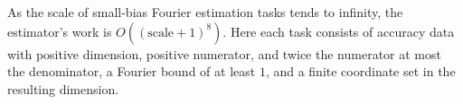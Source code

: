 \begin{theorem}
\label{FABL.deterministicSmallBiasFourierEstimator_work_isBigO}
\leanok
{}
As the scale of small-bias Fourier estimation tasks tends to infinity, the estimator's
work is $O((\text{scale}+1)^8)$. Here each task consists of accuracy data with positive
dimension, positive numerator, and twice the numerator at most the denominator, a
Fourier bound of at least $1$, and a finite coordinate set in the resulting dimension.
\end{theorem}
